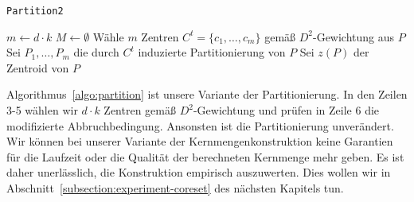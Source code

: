 \begin{algorithm}
\caption{\texttt{Partition2}}
\label{algo:partition}
	\DontPrintSemicolon
	
	\BlankLine
	
	$m \leftarrow d \cdot k$\;
	$M \leftarrow \emptyset$\;
	Wähle $m$ Zentren $C^t = \{c_1, \dots, c_m\}$ gemäß $D^2$-Gewichtung aus $P$\;
	Sei $P_1, \dots, P_m$ die durch $C^t$ induzierte Partitionierung von $P$\;
	Sei $z(P)$ der Zentroid von $P$\;
\end{algorithm}
Algorithmus~\ref{algo:partition} ist unsere Variante der Partitionierung. In den Zeilen 3-5 wählen wir $d \cdot k$ Zentren
gemäß $D^2$-Gewichtung und prüfen in Zeile 6 die modifizierte Abbruchbedingung. Ansonsten ist die Partitionierung unverändert.
\absatz
Wir können bei unserer Variante der Kernmengenkonstruktion keine Garantien für die Laufzeit oder die Qualität der berechneten
Kernmenge mehr geben. Es ist daher unerlässlich, die Konstruktion empirisch auszuwerten. Dies wollen wir in
Abschnitt~\ref{subsection:experiment-coreset} des nächsten Kapitels tun.